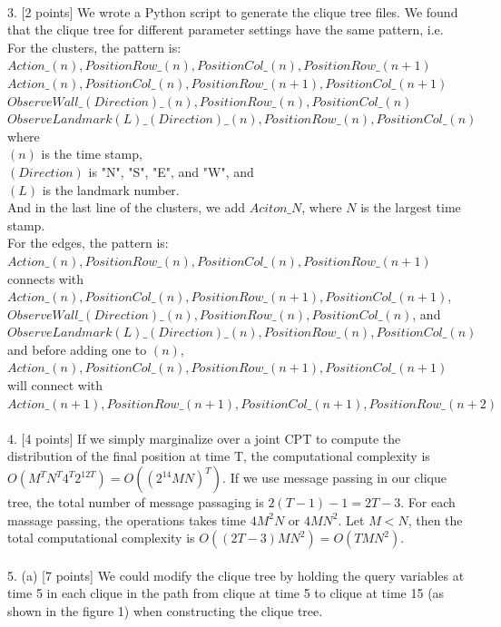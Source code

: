 \documentclass[letterpaper, 11pt]{article}
\begin{document}
\\
3. [2 points]
We wrote a Python script to generate the clique tree files. We found that the clique tree for different parameter settings have the same pattern, i.e. \\
For the clusters, the pattern is:\\
$Action\_(n),PositionRow\_(n),PositionCol\_(n),PositionRow\_(n+1)$\\
$Action\_(n),PositionCol\_(n),PositionRow\_(n+1),PositionCol\_(n+1)$\\
$ObserveWall\_(Direction)\_(n),PositionRow\_(n),PositionCol\_(n)$\\
$ObserveLandmark(L)\_(Direction)\_(n),PositionRow\_(n),PositionCol\_(n)$\\
where\\ 
$(n)$ is the time stamp, \\
$(Direction)$ is "N", "S", "E", and "W", and \\
$(L)$ is the landmark number.\\
And in the last line of the clusters, we add $Aciton\_N$, where $N$ is the largest time stamp.\\

\noindent
For the edges, the pattern is:\\
$Action\_(n),PositionRow\_(n),PositionCol\_(n),PositionRow\_(n+1)$\\
connects with\\
$Action\_(n),PositionCol\_(n),PositionRow\_(n+1),PositionCol\_(n+1)$, \\
$ObserveWall\_(Direction)\_(n),PositionRow\_(n),PositionCol\_(n)$, and\\
$ObserveLandmark(L)\_(Direction)\_(n),PositionRow\_(n),PositionCol\_(n)$\\

\noindent
and before adding one to $(n)$, \\
$Action\_(n),PositionCol\_(n),PositionRow\_(n+1),PositionCol\_(n+1)$\\ 
will connect with\\ 
$Action\_(n+1),PositionRow\_(n+1),PositionCol\_(n+1),PositionRow\_(n+2)$\\
\\
4. [4 points]
If we simply marginalize over a joint CPT to compute the distribution of the final position at time T, the computational complexity is $O(M^TN^T4^T2^{12T}) = O((2^{14}MN)^T)$. If we use message passing in our clique tree, the total number of message passaging is $2(T-1)-1 = 2T-3$. For each massage passing, the operations takes time $4M^2N$ or $4MN^2$. Let $M < N$, then the total computational complexity is $O((2T-3)MN^2) = O(TMN^2)$.\\
\\
5. (a) [7 points]
We could modify the clique tree by holding the query variables at time 5 in each clique in the path from clique at time 5 to clique at time 15 (as shown in the figure 1) when constructing the clique tree.
\end{document}
